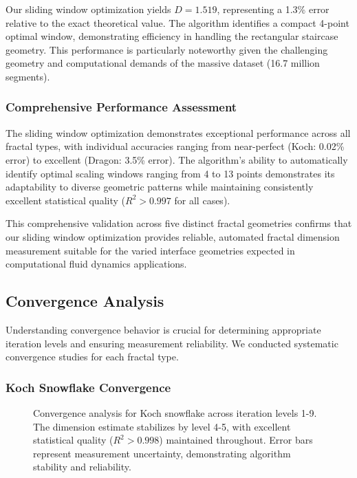 \documentclass[preprint,12pt]{elsarticle}
\begin{document}
Our sliding window optimization yields $D = 1.519$, representing a 1.3\% error relative to the exact theoretical value. The algorithm identifies a compact 4-point optimal window, demonstrating efficiency in handling the rectangular staircase geometry. This performance is particularly noteworthy given the challenging geometry and computational demands of the massive dataset (16.7 million segments).

\subsubsection{Comprehensive Performance Assessment}

The sliding window optimization demonstrates exceptional performance across all fractal types, with individual accuracies ranging from near-perfect (Koch: 0.02\% error) to excellent (Dragon: 3.5\% error). The algorithm's ability to automatically identify optimal scaling windows ranging from 4 to 13 points demonstrates its adaptability to diverse geometric patterns while maintaining consistently excellent statistical quality ($R^2 > 0.997$ for all cases).

This comprehensive validation across five distinct fractal geometries confirms that our sliding window optimization provides reliable, automated fractal dimension measurement suitable for the varied interface geometries expected in computational fluid dynamics applications.

\subsection{Convergence Analysis}

Understanding convergence behavior is crucial for determining appropriate iteration levels and ensuring measurement reliability. We conducted systematic convergence studies for each fractal type.

\subsubsection{Koch Snowflake Convergence}

\begin{figure}[ht]
\centering
\caption{Convergence analysis for Koch snowflake across iteration levels 1-9. The dimension estimate stabilizes by level 4-5, with excellent statistical quality ($R^2 > 0.998$) maintained throughout. Error bars represent measurement uncertainty, demonstrating algorithm stability and reliability.}
\label{fig:koch_convergence}
\end{figure}
\end{document}
